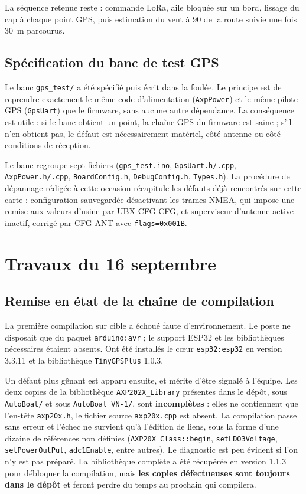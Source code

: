 \documentclass[11pt,a4paper]{article}
\newcommand{\code}[1]{\texttt{#1}}
\begin{document}
La séquence retenue reste : commande LoRa, aile bloquée sur un bord, lissage du
cap à chaque point GPS, puis estimation du vent à $90$\textdegree{} de la route suivie une
fois 30~m parcourus.

\subsection{Spécification du banc de test GPS}

Le banc \code{gps\_test/} a été spécifié puis écrit dans la foulée. Le principe est
de reprendre exactement le même code d'alimentation (\code{AxpPower}) et le même
pilote GPS (\code{GpsUart}) que le firmware, sans aucune autre dépendance. La
conséquence est utile : si le banc obtient un point, la chaîne GPS du firmware
est saine ; s'il n'en obtient pas, le défaut est nécessairement matériel,
côté antenne ou côté conditions de réception.

Le banc regroupe sept fichiers (\code{gps\_test.ino}, \code{GpsUart.h/.cpp},
\code{AxpPower.h/.cpp}, \code{BoardConfig.h}, \code{DebugConfig.h}, \code{Types.h}). La procédure
de dépannage rédigée à cette occasion récapitule les défauts déjà rencontrés
sur cette carte : configuration sauvegardée désactivant les trames NMEA, qui
impose une remise aux valeurs d'usine par UBX CFG-CFG, et superviseur
d'antenne active inactif, corrigé par CFG-ANT avec \code{flags=0x001B}.

\section{Travaux du 16 septembre}

\subsection{Remise en état de la chaîne de compilation}

La première compilation sur cible a échoué faute d'environnement. Le poste ne
disposait que du paquet \code{arduino:avr} ; le support ESP32 et les bibliothèques
nécessaires étaient absents. Ont été installés le cœur \code{esp32:esp32} en
version 3.3.11 et la bibliothèque \code{TinyGPSPlus} 1.0.3.

Un défaut plus gênant est apparu ensuite, et mérite d'être signalé à l'équipe.
Les deux copies de la bibliothèque \code{AXP202X\_Library} présentes dans le dépôt,
sous \code{AutoBoat/} et sous \code{AutoBoat\_VN-1/}, sont \textbf{incomplètes} : elles ne
contiennent que l'en-tête \code{axp20x.h}, le fichier source \code{axp20x.cpp} est
absent. La compilation passe sans erreur et l'échec ne survient qu'à l'édition
de liens, sous la forme d'une dizaine de références non définies
(\code{AXP20X\_Class::begin}, \code{setLDO3Voltage}, \code{setPowerOutPut}, \code{adc1Enable},
entre autres). Le diagnostic est peu évident si l'on n'y est pas préparé. La
bibliothèque complète a été récupérée en version 1.1.3 pour débloquer la
compilation, mais \textbf{les copies défectueuses sont toujours dans le dépôt} et
feront perdre du temps au prochain qui compilera.
\end{document}
